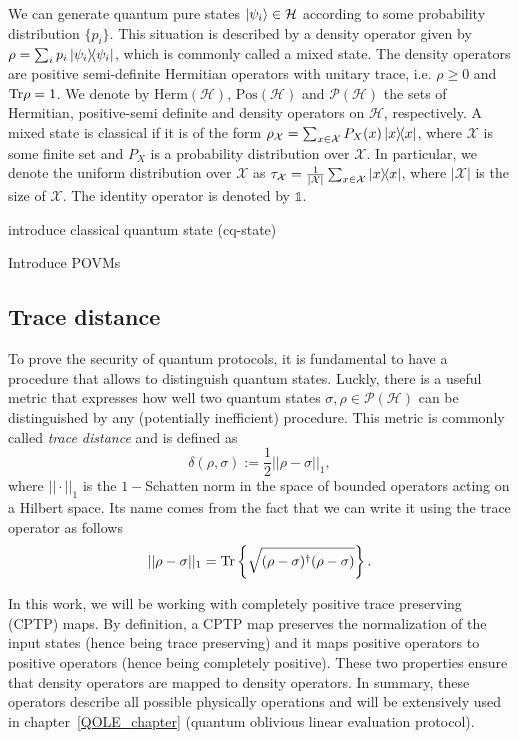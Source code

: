 We can generate quantum pure states $| \psi_i \rangle\in \mathcal{H}$ according to some probability distribution $\{p_i\}$. This situation is described by a density operator given by $\rho = \sum_i p_i \ketbra{\psi_i}$, which is commonly called a mixed state. The density operators are positive semi-definite Hermitian operators with unitary trace, i.e. $\rho \geq 0$ and $\text{Tr} \rho = 1$. We denote by $\text{Herm}(\mathcal{H})$, $\text{Pos}(\mathcal{H})$  and $\mathcal{P}(\mathcal{H})$ the sets of Hermitian, positive-semi definite and density operators on $\mathcal{H}$, respectively.
A mixed state is classical if it is of the form $\rho_{\mathcal{X}} = \sum_{x\in\mathcal{X}} P_X(x)\ketbra{x}$, where $\mathcal{X}$ is some finite set and $P_X$ is a probability distribution over $\mathcal{X}$. In particular, we denote the uniform distribution over $\mathcal{X}$ as $\tau_{\mathcal{X}} = \frac{1}{|\mathcal{X}|}\sum_{x\in\mathcal{X}}\ketbra{x}$, where $|\mathcal{X}|$ is the size of $\mathcal{X}$. The identity operator is denoted by $\mathds{1}$. 

{\cv introduce classical quantum state (cq-state)}

{\cv Introduce POVMs}


\subsection{Trace distance}

To prove the security of quantum protocols, it is fundamental to have a procedure that allows to distinguish quantum states. Luckly, there is a useful metric that expresses how well two quantum states $\sigma, \rho \in \mathcal{P}(\mathcal{H})$ can be distinguished by any (potentially inefficient) procedure. This metric is commonly called \textit{trace distance} and is defined as \cite{U17}
\begin{equation*}
    \delta(\rho,\sigma):=\frac{1}{2}||\rho-\sigma||_1,
\end{equation*}
where $||\cdot||_1$ is the $1-$Schatten norm in the space of bounded operators acting on a Hilbert space. Its name comes from the fact that we can write it using the trace operator as follows
\begin{equation*}
    ||\rho-\sigma||_1=\Tr\left\{\sqrt{(\rho-\sigma)^\dagger(\rho-\sigma)}\right\}.
\end{equation*}

In this work, we will be working with completely positive trace preserving (CPTP) maps. By definition, a CPTP map preserves the normalization of the input states (hence being trace preserving) and it maps positive operators to positive operators (hence being completely positive). These two properties ensure that density operators are mapped to density operators. In summary, these operators describe all possible physically operations and will be extensively used in chapter~\ref{QOLE_chapter} (quantum oblivious linear evaluation protocol). 

